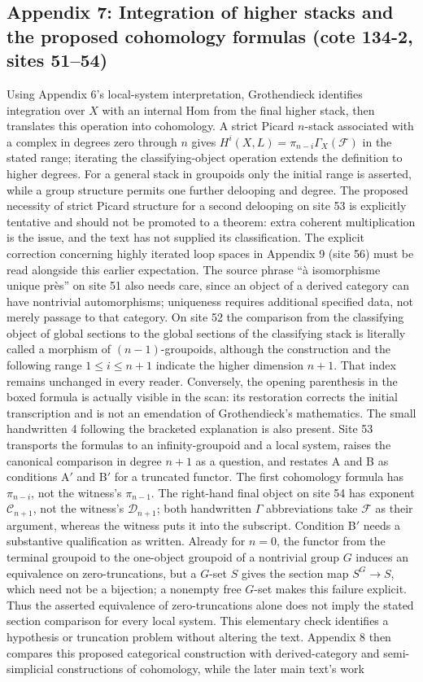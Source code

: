 \documentclass[10pt,oneside]{book}
\begin{document}
\subsection*{Appendix 7: Integration of higher stacks and the proposed cohomology formulas (cote 134-2, sites 51--54)}
Using Appendix 6's local-system interpretation, Grothendieck identifies integration over $X$ with an internal Hom from the final higher stack, then translates this operation into cohomology. A strict Picard $n$-stack associated with a complex in degrees zero through $n$ gives $H^i(X,L)=\pi_{n-i}\Gamma_X(\mathcal F)$ in the stated range; iterating the classifying-object operation extends the definition to higher degrees. For a general stack in groupoids only the initial range is asserted, while a group structure permits one further delooping and degree. The proposed necessity of strict Picard structure for a second delooping on site 53 is explicitly tentative and should not be promoted to a theorem: extra coherent multiplication is the issue, and the text has not supplied its classification. The explicit correction concerning highly iterated loop spaces in Appendix 9 (site 56) must be read alongside this earlier expectation. The source phrase ``à isomorphisme unique près'' on site 51 also needs care, since an object of a derived category can have nontrivial automorphisms; uniqueness requires additional specified data, not merely passage to that category. On site 52 the comparison from the classifying object of global sections to the global sections of the classifying stack is literally called a morphism of $(n-1)$-groupoids, although the construction and the following range $1\leq i\leq n+1$ indicate the higher dimension $n+1$. That index remains unchanged in every reader. Conversely, the opening parenthesis in the boxed formula is actually visible in the scan: its restoration corrects the initial transcription and is not an emendation of Grothendieck's mathematics. The small handwritten 4 following the bracketed explanation is also present. Site 53 transports the formulas to an infinity-groupoid and a local system, raises the canonical comparison in degree $n+1$ as a question, and restates A and B as conditions A$'$ and B$'$ for a truncated functor. The first cohomology formula has $\pi_{n-i}$, not the witness's $\pi_{n-1}$. The right-hand final object on site 54 has exponent $\mathcal C_{n+1}$, not the witness's $\mathcal D_{n+1}$; both handwritten $\Gamma$ abbreviations take $\mathcal F$ as their argument, whereas the witness puts it into the subscript. Condition B$'$ needs a substantive qualification as written. Already for $n=0$, the functor from the terminal groupoid to the one-object groupoid of a nontrivial group $G$ induces an equivalence on zero-truncations, but a $G$-set $S$ gives the section map $S^G\to S$, which need not be a bijection; a nonempty free $G$-set makes this failure explicit. Thus the asserted equivalence of zero-truncations alone does not imply the stated section comparison for every local system. This elementary check identifies a hypothesis or truncation problem without altering the text. Appendix 8 then compares this proposed categorical construction with derived-category and semi-simplicial constructions of cohomology, while the later main text's work 
\end{document}
